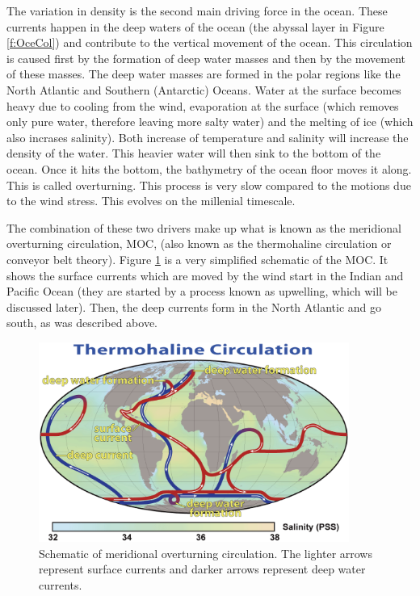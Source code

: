 The variation in density is the second main driving force in the ocean.  These currents happen in the deep waters of the ocean (the abyssal layer in Figure \protect \ref{f:OceCol}) and contribute to the vertical movement of the ocean.  This circulation is caused first by the formation of deep water masses and then by the movement of these masses.  The deep water masses are formed in the polar regions like the North Atlantic and Southern (Antarctic) Oceans.  Water at the surface becomes heavy due to cooling from the wind, evaporation at the surface (which removes only pure water, therefore leaving more salty water) and the melting of ice (which also incrases salinity).  Both increase of temperature and salinity will increase the density of the water.  This heavier water will then sink to the bottom of the ocean.  Once it hits the bottom, the bathymetry of the ocean floor moves it along.  This is called overturning.  This process is very slow compared to the motions due to the wind stress.  This evolves on the millenial timescale.

The combination of these two drivers make up what is known as the meridional overturning circulation, MOC, (also known as the thermohaline circulation or conveyor belt theory).   Figure \protect \ref{f:ConvBelt} is a very simplified schematic of the MOC.  It shows the surface currents which are moved by the wind start in the Indian and Pacific Ocean (they are started by a process known as upwelling, which will be discussed later).  Then, the deep currents form in the North Atlantic and go south, as was described above. \cite{94CushRoi}

\begin{center}
\begin{figure}[h!]
\centering
  \includegraphics[width=4in]{Images/ConvBelt}
  \caption[Schematic of meridional overturning circulation]{Schematic of meridional overturning circulation.  The lighter arrows represent surface currents and darker arrows represent deep water currents.  \cite{Wiki}}\label{f:ConvBelt}
\end{figure}
\end{center}

